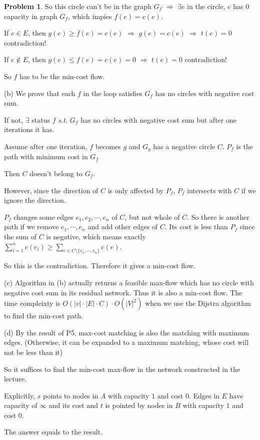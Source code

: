 \documentclass[a4paper]{article}
\theoremstyle{definition}
\newtheorem{problem}{Problem}
\theoremstyle{plain}
\newcommand{\dps}{\displaystyle}
\numberwithin{equation}{problem}
\newcommand{\st}{ \textit{ s.t. }}
\begin{document}
\begin{problem}
    So this circle can't be in the graph  $ G_f $ $ \Rightarrow  $  $ \exists e $ in the circle,  $ e $ has  $ 0 $ capacity in graph  $ G_f $, which impies  $ f(e)=c(e) $.
    
    If  $ e\in E $, then  $ g(e) \geq f(e)=c(e) $ $ \Rightarrow  $  $ g(e)=c(e) $    $ \Rightarrow  $  $ t(e)=0 $ contradiction! 

    If  $ e\not \in E $, then  $ g(e) \leq f(e)=c(e)=0 $ $ \Rightarrow  $  $ t(e)=0 $ contradiction!
    
    So  $ f $ has to be the min-cost flow.
    
    (b) We prove that each  $ f $ in the loop satisfies  $ G_f $ has no circles with negative cost sum.
    
    If not,  $ \exists $ status  $ f $ \st  $ G_f $ has no circles with negative cost sum but after one iterations it has.

    Assume after one iteration,  $ f  $ becomes  $ g $ and  $ G_g $ has a negative circle  $ C $.  $ P_f $ is the path with minimum cost in  $ G_f $  
    
    Then  $ C $ doesn't belong to  $ G_f $. 
    
    However, since  the direction of  $ C $ is only affected by  $ P_f $,  $ P_f $ intersects with  $ C $ if we ignore the direction.
    
     $ P_f $ changes some edges  $ e_1,e_2,\cdots,e_n $ of  $ C $, but not whole of  $ C $. So there is another path if we remove   $ e_1,\cdots,e_n $ and add  other edges of  $ C $. Its cost is less than  $ P_f $ since the sum of  $ C $ is negative, which means exactly $ \dps\sum_{i=1}^nc(e_i) \geq \sum_{e\in C\setminus\{e_1,\cdots,e_n\}}c(e) $.      

     So this is the contradiction. Therefore it gives a min-cost flow.


    (c) 
    Algorithm in (b) actually returns a feasible max-flow which has no circle with negative cost sum in its residual network. Thus it is also a min-cost flow. The time compleixty is  $ O(|v|\cdot|E|\cdot C)\cdot O(|V|^2) $ when we use the Dijstra algorithm to find the min-cost path.
    
    (d) By the result of P5, max-cost matching is also the matching with maximum edges. (Otherwise, it can be expanded to a maximum matching, whose cost will not be less than it)

    So it suffices to find the min-cost max-flow in the network constructed in the lecture.

    Explicitly,  $ s $ points to nodes in  $ A $ with capacity  $ 1 $ and cost  $ 0 $. Edges in  $ E $ have capacity of  $ \infty $ and its cost and  $ t $ is pointed by nodes in  $ B $ with capacity  $ 1 $  and cost  $ 0 $.
    
    The answer equals to the result.
\end{problem}
\end{document}
